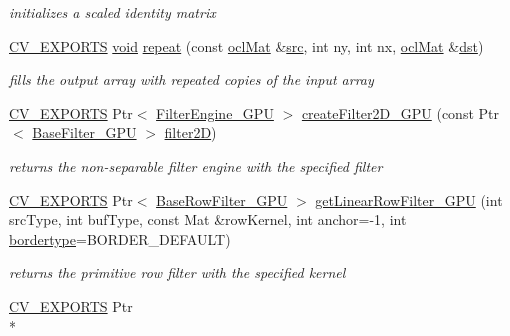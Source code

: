 \begin{DoxyCompactItemize}
\begin{DoxyCompactList}\small\item\em initializes a scaled identity matrix \end{DoxyCompactList}\item 
\hyperlink{core_2types__c_8h_a1bf9f0e121b54272da02379cfccd0a2b}{C\-V\-\_\-\-E\-X\-P\-O\-R\-T\-S} \hyperlink{legacy_8hpp_a8bb47f092d473522721002c86c13b94e}{void} \hyperlink{namespacecv_1_1ocl_afce581f6a344e7521da32cf2cd911486}{repeat} (const \hyperlink{classcv_1_1ocl_1_1oclMat}{ocl\-Mat} \&\hyperlink{legacy_8hpp_a371cd109b74033bc4366f584edd3dacc}{src}, int ny, int nx, \hyperlink{classcv_1_1ocl_1_1oclMat}{ocl\-Mat} \&\hyperlink{photo__c_8h_aed13e2a25279b24dc954073233fef7a5}{dst})
\begin{DoxyCompactList}\small\item\em fills the output array with repeated copies of the input array \end{DoxyCompactList}\item 
\hyperlink{core_2types__c_8h_a1bf9f0e121b54272da02379cfccd0a2b}{C\-V\-\_\-\-E\-X\-P\-O\-R\-T\-S} Ptr$<$ \hyperlink{classcv_1_1ocl_1_1FilterEngine__GPU}{Filter\-Engine\-\_\-\-G\-P\-U} $>$ \hyperlink{namespacecv_1_1ocl_a27be17b6220852350822b0541df40e78}{create\-Filter2\-D\-\_\-\-G\-P\-U} (const Ptr$<$ \hyperlink{classcv_1_1ocl_1_1BaseFilter__GPU}{Base\-Filter\-\_\-\-G\-P\-U} $>$ \hyperlink{namespacecv_1_1ocl_a01ec95bb7d227f90684f8cd7d168f03c}{filter2\-D})
\begin{DoxyCompactList}\small\item\em returns the non-\/separable filter engine with the specified filter \end{DoxyCompactList}\item 
\hyperlink{core_2types__c_8h_a1bf9f0e121b54272da02379cfccd0a2b}{C\-V\-\_\-\-E\-X\-P\-O\-R\-T\-S} Ptr$<$ \hyperlink{classcv_1_1ocl_1_1BaseRowFilter__GPU}{Base\-Row\-Filter\-\_\-\-G\-P\-U} $>$ \hyperlink{namespacecv_1_1ocl_aa26c0f02626f31ade4768915e388a2d7}{get\-Linear\-Row\-Filter\-\_\-\-G\-P\-U} (int src\-Type, int buf\-Type, const Mat \&row\-Kernel, int anchor=-\/1, int \hyperlink{imgproc__c_8h_a217d51a46c1bcfec1157d02663e6e499}{bordertype}=B\-O\-R\-D\-E\-R\-\_\-\-D\-E\-F\-A\-U\-L\-T)
\begin{DoxyCompactList}\small\item\em returns the primitive row filter with the specified kernel \end{DoxyCompactList}\item 
\hyperlink{core_2types__c_8h_a1bf9f0e121b54272da02379cfccd0a2b}{C\-V\-\_\-\-E\-X\-P\-O\-R\-T\-S} Ptr\\*

\end{DoxyCompactItemize}
